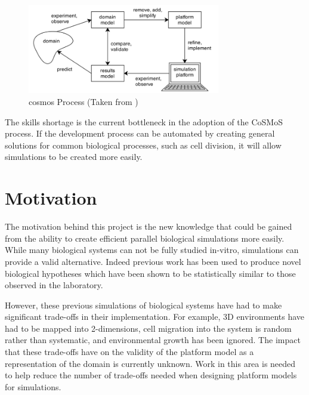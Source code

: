 \documentclass{UoYCSproject}
\begin{document}
\begin{figure}[htp]
\centering
\includegraphics[width=0.75\textwidth]{Appendix/CoSMoS_Process}
\caption{\gls{cosmos} Process (Taken from \cite{mark_read_thesis})}
\label{fig:cosmos_process}
\end{figure}

The skills shortage is the current bottleneck in the adoption of the CoSMoS process.
If the development process can be automated by creating general solutions for common biological processes, such as cell division, it will allow simulations to be created more easily.



\section{Motivation}
The motivation behind this project is the new knowledge that could be gained from the ability to create efficient parallel biological simulations more easily.
While many biological systems can not be fully studied \gls{in-vitro}, simulations can provide a valid alternative.
Indeed previous work has been used to produce novel biological hypotheses which have been shown to be statistically similar to those observed in the laboratory\cite[p.174]{kieran_thesis}.

However, these previous simulations of biological systems have had to make significant trade-offs in their implementation.
For example, 3D environments have had to be mapped into 2-dimensions, cell migration into the system is random rather than systematic, and environmental growth has been ignored\cite{phil_diss}.
The impact that these trade-offs have on the validity of the platform model as a representation of the domain is currently unknown.
Work in this area is needed to help reduce the number of trade-offs needed when designing platform models for simulations.
\end{document}
